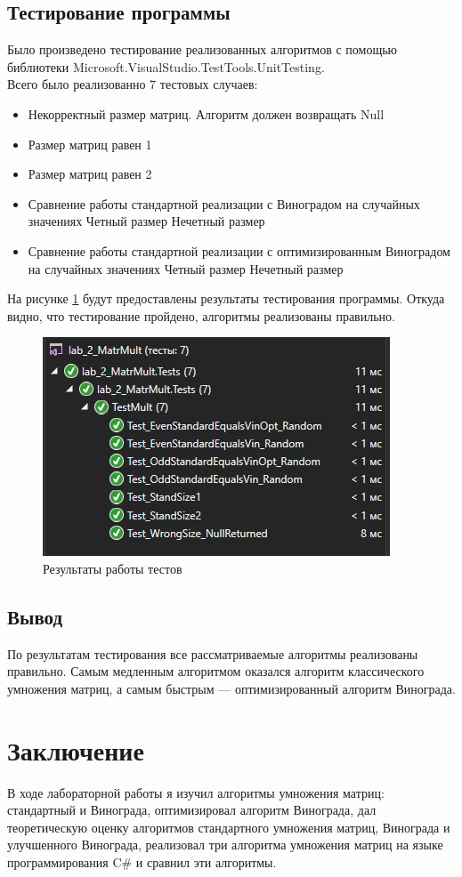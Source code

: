 \documentclass[12pt,a4paper]{article}
\begin{document}
\subsection{Тестирование программы}
Было произведено тестирование реализованных алгоритмов с помощью библиотеки 
Microsoft.VisualStudio.TestTools.UnitTesting.\\
Всего было реализованно 7 тестовых случаев:
\begin{itemize}
	\item Некорректный размер матриц. Алгоритм должен возвращать Null
	\item Размер матриц равен 1
	\item Размер матриц равен 2
	\item Сравнение работы стандартной реализации с Виноградом на случайных значениях
	\subitem Четный размер
	\subitem Нечетный размер
	\item Сравнение работы стандартной реализации с оптимизированным Виноградом на случайных значениях
	\subitem Четный размер
	\subitem Нечетный размер
\end{itemize}

На рисунке \ref{fig:test} будут предоставлены результаты тестирования программы. Откуда видно, что тестирование пройдено, алгоритмы реализованы правильно.
\begin{figure}[!htbp]
\centering
\includegraphics[scale=0.9]{TestsPassed}
\caption{Результаты работы тестов}
\label{fig:test}
\end{figure} 

\subsection{Вывод}
По результатам тестирования все рассматриваемые алгоритмы реализованы правильно. Самым медленным алгоритмом оказался алгоритм классического умножения матриц, а самым быстрым — оптимизированный алгоритм Винограда.

\clearpage
{}
\section*{\Huge Заключение}
В ходе лабораторной работы я изучил алгоритмы умножения матриц: стандартный и Винограда, оптимизировал алгоритм Винограда, дал теоретическую оценку алгоритмов стандартного умножения матриц, Винограда и улучшенного Винограда, реализовал три алгоритма умножения матриц на языке программирования C\# и сравнил эти алгоритмы.
\end{document}
